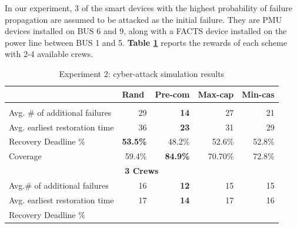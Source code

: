 \documentclass[conference]{IEEEtran}
\begin{document}
In our experiment, 3 of the smart devices with the highest probability of failure propagation are assumed to be attacked as the initial failure. They are PMU devices installed on BUS 6 and 9, along with a FACTS device installed on the power line between BUS 1 and 5. 
\textbf{Table \ref{TB:cyber}} reports the rewards of each scheme with 2-4 available crews.

\begin{table}
\centering
\caption{Experiment 2: cyber-attack simulation results}
\label{TB:cyber}
\begin{tabular}{|lrrrr|}
\hline
\rowcolor[HTML]{D9D9D9} 
\multicolumn{1}{|l|}{\cellcolor[HTML]{D9D9D9}Recovery schemes} &
  \multicolumn{1}{l|}{\cellcolor[HTML]{D9D9D9}Rand} &
  \multicolumn{1}{l|}{\cellcolor[HTML]{D9D9D9}Pre-com} &
  \multicolumn{1}{l|}{\cellcolor[HTML]{D9D9D9}Max-cap} &
  \multicolumn{1}{l|}{\cellcolor[HTML]{D9D9D9}Min-cas} \\ \hline
\rowcolor[HTML]{FFFFFF} 
\multicolumn{5}{|c|}{\textbf{2 Crews}} \\ \hline
\multicolumn{1}{|l|}{\cellcolor[HTML]{D9D9D9}Avg. \# of additional failures} &
  \multicolumn{1}{r|}{29} &
  \multicolumn{1}{r|}{\textbf{14}} &
  \multicolumn{1}{r|}{27} &
  21 \\ \hline
\multicolumn{1}{|l|}{\cellcolor[HTML]{D9D9D9}Avg. earliest restoration time} &
  \multicolumn{1}{r|}{36} &
  \multicolumn{1}{r|}{\textbf{23}} &
  \multicolumn{1}{r|}{31} &
  29 \\ \hline
\multicolumn{1}{|l|}{\cellcolor[HTML]{D9D9D9}Recovery Deadline \%} &
  \multicolumn{1}{r|}{\textbf{53.5\%}} &
  \multicolumn{1}{r|}{48.2\%} &
  \multicolumn{1}{r|}{52.6\%} &
  52.8\% \\ \hline
\multicolumn{1}{|l|}{\cellcolor[HTML]{D9D9D9}Coverage} &
  \multicolumn{1}{r|}{59.4\%} &
  \multicolumn{1}{r|}{\textbf{84.9\%}} &
  \multicolumn{1}{r|}{70.70\%} &
  72.8\% \\ \hline
\multicolumn{5}{|c|}{\textbf{3 Crews}} \\ \hline
\multicolumn{1}{|l|}{\cellcolor[HTML]{D9D9D9}Avg.\# of additional failures} &
  \multicolumn{1}{r|}{16} &
  \multicolumn{1}{r|}{\textbf{12}} &
  \multicolumn{1}{r|}{15} &
  15 \\ \hline
\multicolumn{1}{|l|}{\cellcolor[HTML]{D9D9D9}Avg. earliest restoration time} &
  \multicolumn{1}{r|}{17} &
  \multicolumn{1}{r|}{\textbf{14}} &
  \multicolumn{1}{r|}{17} &
  16 \\ \hline
\multicolumn{1}{|l|}{\cellcolor[HTML]{D9D9D9}Recovery Deadline \%} &

\end{tabular}
\end{table}
\end{document}
